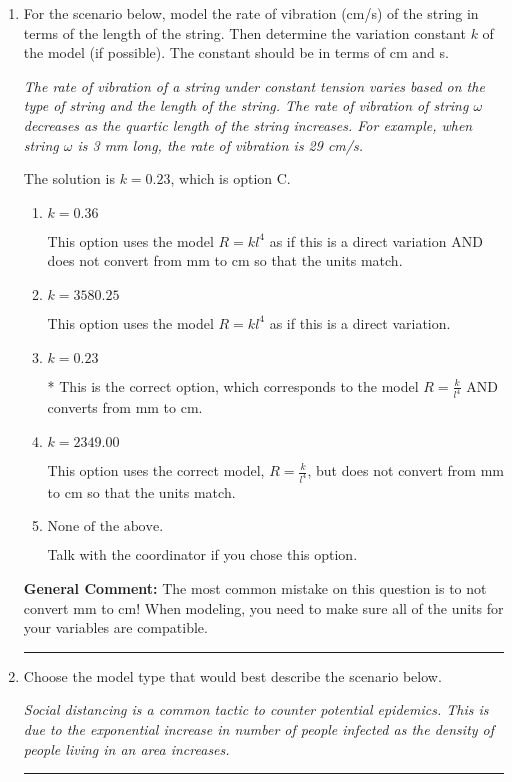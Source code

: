 \documentclass{extbook}[14pt]
\newcommand{\litem}[1]{\item #1

\rule{\textwidth}{0.4pt}}
\begin{document}
\begin{enumerate}\litem{
For the scenario below, model the rate of vibration (cm/s) of the string in terms of the length of the string. Then determine the variation constant $k$ of the model (if possible). The constant should be in terms of cm and s.

\begin{center}
    \textit{ The rate of vibration of a string under constant tension varies based on the type of string and the length of the string. The rate of vibration of string $\omega$ decreases as the quartic length of the string increases. For example, when string $\omega$ is 3 mm long, the rate of vibration is 29 cm/s. }
\end{center}


The solution is \( k = 0.23 \), which is option C.\begin{enumerate}[label=\Alph*.]
\item \( k = 0.36 \)

This option uses the model $R = kl^{4}$ as if this is a direct variation AND does not convert from mm to cm so that the units match.
\item \( k = 3580.25 \)

This option uses the model $R = kl^{4}$ as if this is a direct variation.
\item \( k = 0.23 \)

* This is the correct option, which corresponds to the model $R = \frac{k}{l^{4}}$ AND converts from mm to cm.
\item \( k = 2349.00 \)

This option uses the correct model, $R = \frac{k}{l^{4}}$, but does not convert from mm to cm so that the units match.
\item \( \text{None of the above.} \)

Talk with the coordinator if you chose this option.
\end{enumerate}

\textbf{General Comment:} The most common mistake on this question is to not convert mm to cm! When modeling, you need to make sure all of the units for your variables are compatible.
}
\litem{
Choose the model type that would best describe the scenario below.

\begin{center}
    \textit{ Social distancing is a common tactic to counter potential epidemics. This is due to the exponential increase in number of people infected as the density of people living in an area increases. }
\end{center}


}
\end{enumerate}
\end{document}
